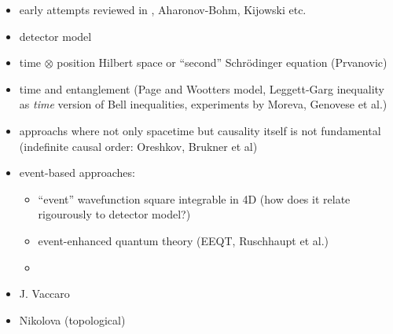 \begin{itemize}
\item early attempts reviewed in \cite{TQM1, TQM2}, Aharonov-Bohm, Kijowski etc.
\item detector model \cite{TQM1, TQM2}
\item
    time $\otimes$ position Hilbert space or ``second'' Schr\"odinger equation (Prvanovic)
\item time and entanglement (Page and Wootters model, Leggett-Garg inequality as \emph{time} version of Bell inequalities, experiments by Moreva, Genovese et al.)
\item approachs where not only spacetime but causality itself is not fundamental (indefinite causal order: Oreshkov, Brukner et al)
\item event-based approaches: 
  \begin{itemize}
    \item ``event'' wavefunction square integrable in 4D (how does it relate rigourously to detector model?)
    \item event-enhanced quantum theory (EEQT, Ruschhaupt et al.)
    \item 
  \end{itemize}
\item J. Vaccaro
\item Nikolova (topological)
\end{itemize}
